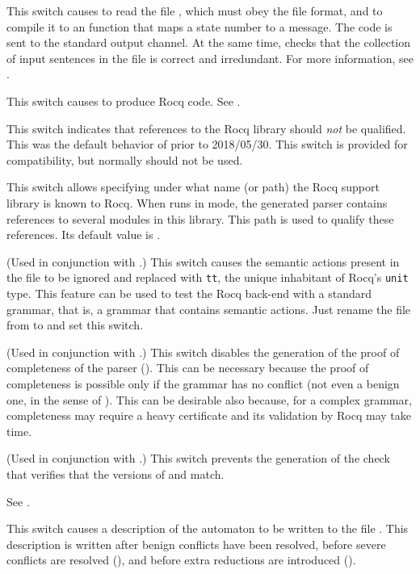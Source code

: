 \documentclass[onecolumn,11pt,nocopyrightspace,preprint]{sigplanconf}
\begin{document}
 This switch causes \menhir to read the
file , which must obey the \messages file format, and to compile
it to an \ocaml function that maps a state number to a message. The \ocaml code
is sent to the standard output channel. At the same time, \menhir checks that
the collection of input sentences in the file  is correct and
irredundant. For more information, see .

\docswitch{\orocq} This switch causes \menhir to produce Rocq code. See .

\docswitch{\orocqlibnopath} This switch indicates that references to the Rocq
library \rocqmenhirlib should \emph{not} be qualified. This was the default
behavior of \menhir prior to 2018/05/30. This switch is provided for
compatibility, but normally should not be used.

 This switch allows specifying under what
name (or path) the Rocq support library is known to Rocq. When \menhir runs in
\orocq mode, the generated parser contains references to several modules in
this library. This path is used to qualify these references. Its default value
is \rocqmenhirlib.

\docswitch{\orocqnoactions} (Used in conjunction with \orocq.) This switch
causes the semantic actions present in the \vy file to be ignored and
replaced with \verb+tt+, the unique inhabitant of Rocq's \verb+unit+ type. This
feature can be used to test the Rocq back-end with a standard grammar, that is, a
grammar that contains \ocaml semantic actions. Just rename the file from
\mly to \vy and set this switch.

\docswitch{\orocqnocomplete} (Used in conjunction with \orocq.) This switch
disables the generation of the proof of completeness of the parser
(). This can be necessary because the proof of completeness is
possible only if the grammar has no conflict (not even a benign one, in the
sense of ). This can be desirable also because, for
a complex grammar, completeness may require a heavy certificate and its
validation by Rocq may take time.

\docswitch{\orocqnoversioncheck} (Used in conjunction with \orocq.) This switch
prevents the generation of the check that verifies that the versions of
\menhir and \rocqmenhirlib match.

\docswitch{\odepend} See .

\docswitch{\odump} This switch causes a description of the automaton to be
written to the file \automaton. This description is written after
benign conflicts have been resolved, before severe conflicts are resolved
(), and before extra reductions are introduced
().
\end{document}
